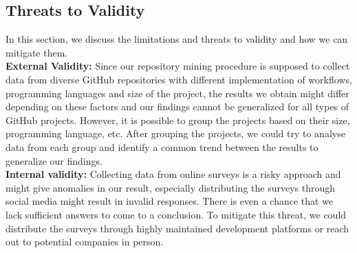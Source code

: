 \documentclass[conference]{IEEEtran}
\begin{document}
\subsection{Threats to Validity}
In this section, we discuss the limitations and threats to
validity and how we can mitigate them.\\

\textbf{External Validity:} Since our repository mining procedure is supposed to collect data from diverse GitHub repositories with different implementation of workflows, programming languages and size of the project, the results we obtain might differ depending on these factors and our findings cannot be generalized for all types of GitHub projects. However, it is possible to group the projects based on their size, programming language, etc. After grouping the projects, we could try to analyse data from each group and identify a common trend between the results to generalize our findings.\\

\textbf{Internal validity:} Collecting data from online surveys is a risky approach and might give anomalies in our result, especially distributing the surveys through social media might result in invalid responses. There is even a chance that we lack sufficient answers to come to a conclusion. To mitigate this threat, we could distribute the surveys through highly maintained development platforms or reach out to potential companies in person. 



\vspace{12pt}
\end{document}
